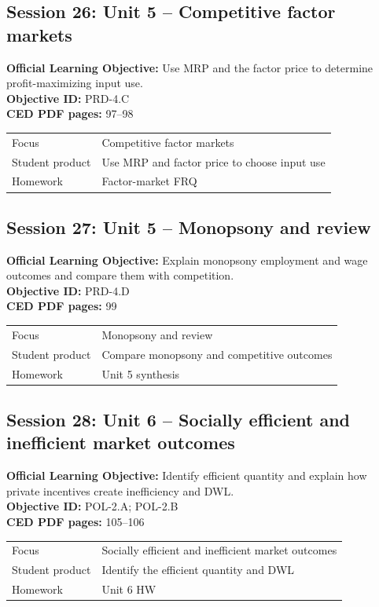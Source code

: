 \documentclass[11pt,a4paper]{article}
\newcommand{\objectivebox}[1]{\noindent\colorbox{aplight}{\parbox{0.96\textwidth}{#1}}}
\begin{document}
\subsection{Session 26: Unit 5 -- Competitive factor markets}
\objectivebox{\textbf{Official Learning Objective:} Use MRP and the factor price to determine profit-maximizing input use.\\\textbf{Objective ID:} PRD-4.C\\\textbf{CED PDF pages:} 97–98}\par\vspace{0.4em}
\begin{tabularx}{\textwidth}{p{3.0cm}Y}
\toprule
Focus & Competitive factor markets\\
Student product & Use MRP and factor price to choose input use\\
Homework & Factor-market FRQ\\
\bottomrule
\end{tabularx}
\subsection{Session 27: Unit 5 -- Monopsony and review}
\objectivebox{\textbf{Official Learning Objective:} Explain monopsony employment and wage outcomes and compare them with competition.\\\textbf{Objective ID:} PRD-4.D\\\textbf{CED PDF pages:} 99}\par\vspace{0.4em}
\begin{tabularx}{\textwidth}{p{3.0cm}Y}
\toprule
Focus & Monopsony and review\\
Student product & Compare monopsony and competitive outcomes\\
Homework & Unit 5 synthesis\\
\bottomrule
\end{tabularx}
\subsection{Session 28: Unit 6 -- Socially efficient and inefficient market outcomes}
\objectivebox{\textbf{Official Learning Objective:} Identify efficient quantity and explain how private incentives create inefficiency and DWL.\\\textbf{Objective ID:} POL-2.A; POL-2.B\\\textbf{CED PDF pages:} 105–106}\par\vspace{0.4em}
\begin{tabularx}{\textwidth}{p{3.0cm}Y}
\toprule
Focus & Socially efficient and inefficient market outcomes\\
Student product & Identify the efficient quantity and DWL\\
Homework & Unit 6 HW\\
\bottomrule
\end{tabularx}
\end{document}
